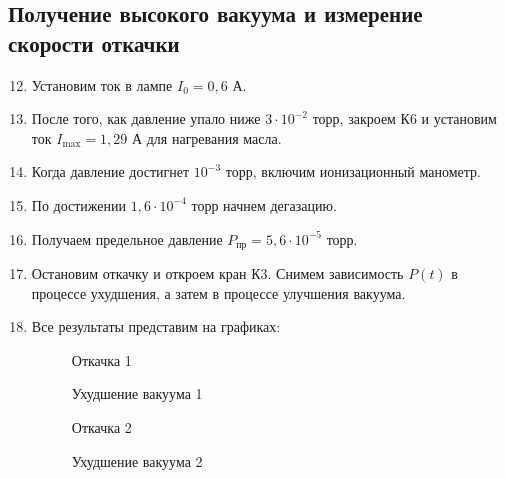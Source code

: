 \documentclass[12pt]{article}
\begin{document}
    \subsection{Получение высокого вакуума и измерение скорости откачки}
    \begin{enumerate}
        \setcounter{enumi}{11}
        \item Установим ток в лампе $I_0 = 0{,}6$ А.
        \item После того, как давление упало ниже $3\cdot 10^{-2}$ торр, 
        закроем К6 и установим ток $I_{\text{max}} = 1{,}29$ А для нагревания
        масла. 
        \item Когда давление достигнет $10^{-3}$ торр, включим ионизационный
        манометр.
        \item По достижении $1{,}6\cdot 10^{-4}$ торр начнем дегазацию.
        \item Получаем предельное давление $P_{\text{пр}} = 5{,}6\cdot 10^{-5}$
        торр.
        \item Остановим откачку и откроем кран К3. Снимем зависимость $P(t)$
        в процессе ухудшения, а затем в процессе улучшения вакуума.
        \item Все результаты представим на графиках:
        \begin{figure}[H]
            \centering
            
            \caption{Откачка 1}
        \end{figure}
        \begin{figure}[H]
            \centering
            
            \caption{Ухудшение вакуума 1}
        \end{figure}
        \begin{figure}[H]
            \centering
            
            \caption{Откачка 2}
        \end{figure}
        \begin{figure}[H]
            \centering
            
            \caption{Ухудшение вакуума 2}
        \end{figure}
    \end{enumerate}
\end{document}
